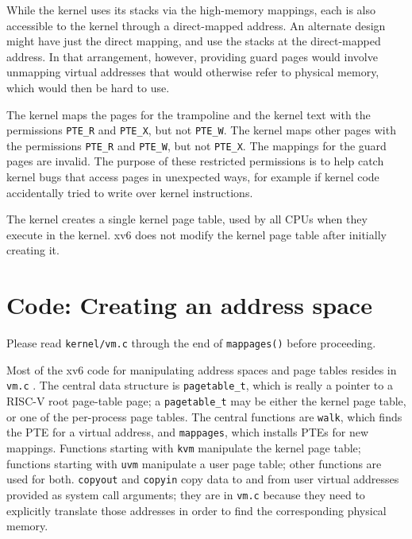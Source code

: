 While the kernel uses its stacks via the high-memory mappings, each
is also accessible to the kernel through a direct-mapped address. An
alternate design might have just the direct mapping, and use the
stacks at the direct-mapped address. In that arrangement, however,
providing guard pages would involve unmapping virtual addresses that
would otherwise refer to physical memory, which would then be hard to
use.

The kernel maps the pages for the trampoline and the kernel text with
the permissions
\lstinline{PTE_R}
and
\lstinline{PTE_X}, but not \lstinline{PTE_W}.
The kernel maps other pages with the permissions
\lstinline{PTE_R}
and
\lstinline{PTE_W},
but not \lstinline{PTE_X}.
The mappings for the guard pages are invalid.
The purpose of these restricted permissions is to help
catch kernel bugs that access pages in unexpected
ways, for example if kernel code accidentally tried
to write over kernel instructions.

The kernel creates a single kernel page table, used by all CPUs when
they execute in the kernel. xv6 does not modify the kernel page
table after initially creating it.

\section{Code: Creating an address space}

Please read \lstinline{kernel/vm.c}  through the end of {\tt mappages()}
before proceeding.

Most of the xv6 code for manipulating address spaces and
page tables resides in {\tt vm.c}
.
The central data structure is {\tt pagetable\_t}, which
is really a pointer to a RISC-V root page-table page;
a {\tt pagetable\_t} may be either the kernel
page table, or one of the per-process page tables.
The central functions are {\tt walk},
which finds the PTE for a virtual address,
and {\tt mappages}, which installs PTEs for new mappings.
Functions starting with {\tt kvm} manipulate
the kernel page table; functions starting with {\tt uvm}
manipulate a user page table; other functions are
used for both.
{\tt copyout} and {\tt copyin} copy data to and from
user virtual addresses provided as system call arguments;
they are in {\tt vm.c} because they need to explicitly
translate those addresses in order to find the corresponding
physical memory.

